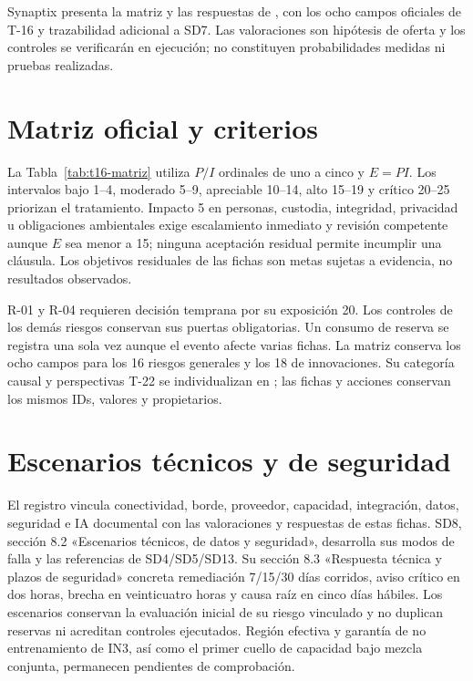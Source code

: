 \documentclass[11pt,letterpaper]{report}
\begin{document}
\tableofcontents\clearpage
{}
Synaptix presenta la matriz y las respuestas de \ArchivoSDOcho{}, con los ocho campos oficiales de T-16 y trazabilidad adicional a SD7. Las valoraciones son hipótesis de oferta y los controles se verificarán en ejecución; no constituyen probabilidades medidas ni pruebas realizadas. \parencites[Formulario T-16, p.~63]{sd8-ba}[RT-19.04, p.~33]{sd8-bt}[cap.~10, p.~26; cap.~13, pp.~28--30; cap.~15, pp.~33--36]{sd8-c07}
\section{Matriz oficial y criterios}
La Tabla~\ref{tab:t16-matriz} utiliza $P/I$ ordinales de uno a cinco y $E=PI$. Los intervalos bajo 1--4, moderado 5--9, apreciable 10--14, alto 15--19 y crítico 20--25 priorizan el tratamiento. Impacto 5 en personas, custodia, integridad, privacidad u obligaciones ambientales exige escalamiento inmediato y revisión competente aunque $E$ sea menor a 15; ninguna aceptación residual permite incumplir una cláusula. Los objetivos residuales de las fichas son metas sujetas a evidencia, no resultados observados.

R-01 y R-04 requieren decisión temprana por su exposición 20. Los controles de los demás riesgos conservan sus puertas obligatorias. Un consumo de reserva se registra una sola vez aunque el evento afecte varias fichas. La matriz conserva los ocho campos para los 16 riesgos generales y los 18 de innovaciones. Su categoría causal y perspectivas T-22 se individualizan en ; las fichas y acciones conservan los mismos IDs, valores y propietarios.

\section{Escenarios técnicos y de seguridad}
El registro  vincula conectividad, borde, proveedor, capacidad, integración, datos, seguridad e IA documental con las valoraciones y respuestas de estas fichas. SD8, sección 8.2 «Escenarios técnicos, de datos y seguridad», desarrolla sus modos de falla y las referencias de SD4/SD5/SD13. Su sección 8.3 «Respuesta técnica y plazos de seguridad» concreta remediación 7/15/30 días corridos, aviso crítico en dos horas, brecha en veinticuatro horas y causa raíz en cinco días hábiles. Los escenarios conservan la evaluación inicial de su riesgo vinculado y no duplican reservas ni acreditan controles ejecutados. Región efectiva y garantía de no entrenamiento de IN3, así como el primer cuello de capacidad bajo mezcla conjunta, permanecen pendientes de comprobación.
\end{document}
